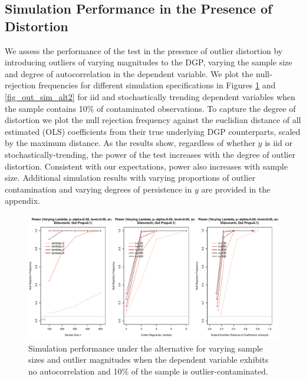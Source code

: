 \documentclass[11pt, letterpaper]{article}
\numberwithin{algorithm}{section}
\numberwithin{assumption}{section}
\numberwithin{lemma}{section}
\numberwithin{theorem}{section}
\numberwithin{corollary}{section}
\numberwithin{remark}{section}
\numberwithin{equation}{section}
\numberwithin{figure}{section}
\numberwithin{table}{section}
\begin{document}
\subsection{Simulation Performance in the Presence of Distortion}
We assess the performance of the test in the presence of outlier distortion by introducing outliers of varying magnitudes to the DGP, varying the sample size and  degree of autocorrelation in the dependent variable. We plot the null-rejection frequencies for different simulation specifications in Figures \ref{fig_out_sim_alt1} and \ref{fig_out_sim_alt2} for iid and stochastically trending dependent variables when the sample contains 10\% of contaminated observations. To capture the degree of distortion we plot the null rejection frequency against the euclidian distance of all estimated (OLS) coefficients from their true underlying DGP counterparts, scaled by the maximum distance. As the results show, regardless of whether $y$ is iid or stochastically-trending, the power of the test increases with the degree of outlier distortion.  Consistent with our expectations, power also increases with sample size. Additional simulation results with varying proportions of outlier contamination and varying degrees of persistence in $y$ are provided in the appendix.

\begin{figure}[!htbp]  %
\centering
\includegraphics[width = \textwidth]{alt_ar0_nreg5_palpha0.05_distnorm_outprop0.1.pdf}
\caption{Simulation performance under the alternative for varying sample sizes and outlier magnitudes when the dependent variable exhibits no autocorrelation and 10\% of the sample is outlier-contaminated.}
\label{fig_out_sim_alt1}
\end{figure}
\end{document}
